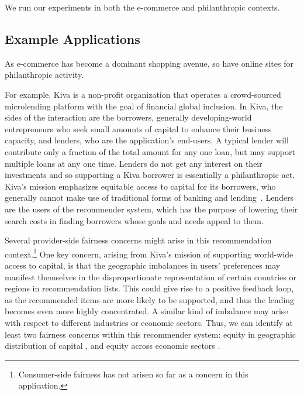
We run our experiments in both the e-commerce and philanthropic contexts.
\subsection{Example Applications}


As e-commerce has become a dominant shopping avenue, so have online sites for philanthropic activity. 

For example, Kiva is a non-profit organization that operates a crowd-sourced microlending platform with the goal of financial global inclusion. In Kiva, the sides of the interaction are the borrowers, generally developing-world entrepreneurs who seek small amounts of capital to enhance their business capacity, and lenders, who are the application's end-users. A typical lender will contribute only a fraction of the total amount for any one loan, but may support multiple loans at any one time. Lenders do not get any interest on their investments and so supporting a Kiva borrower is essentially a philanthropic act. Kiva's mission emphasizes equitable access to capital for its borrowers, who generally cannot make use of traditional forms of banking and lending~\cite{Choo_understanding_kiva}. Lenders are the users of the recommender system, which has the purpose of lowering their search costs in finding borrowers whose goals and needs appeal to them. 

Several provider-side fairness concerns might arise in this recommendation context.\footnote{Consumer-side fairness has not arisen so far as a concern in this application.} One key concern, arising from Kiva's mission of supporting world-wide access to capital, is that the geographic imbalances in users' preferences may manifest themselves in the disproportionate representation of certain countries or regions in recommendation lists. This could give rise to a positive feedback loop, as the recommended items are more likely to be supported, and thus the lending becomes even more highly concentrated. A similar kind of imbalance may arise with respect to different industries or economic sectors. Thus, we can identify at least two fairness concerns within this recommender system: equity in geographic distribution of capital \cite{liu2019personalized}, and equity across economic sectors \cite{Sonboli202Oofair}.


